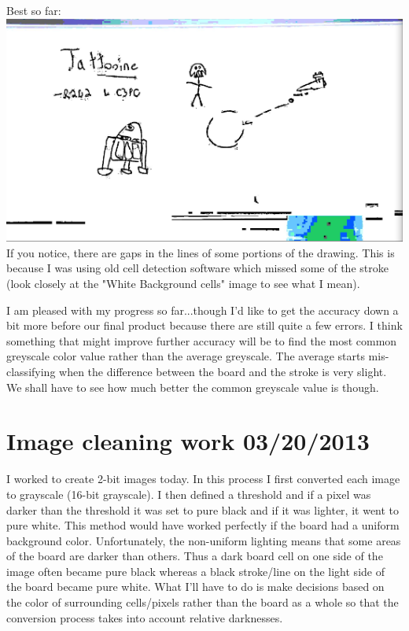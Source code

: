 \documentclass[]{article}
\begin{document}
	Best so far: \\
	\includegraphics[scale=1]{images/Best.png} \\
	
	If you notice, there are gaps in the lines of some portions of the drawing. This is because I was using old cell detection software which missed some of the stroke (look closely at the "White Background cells" image to see what I mean).
	
	I am pleased with my progress so far...though I'd like to get the accuracy down a bit more before our final product because there are still quite a few errors. I think something that might improve further accuracy will be to find the most common greyscale color value rather than the average greyscale. The average starts mis-classifying when the difference between the board and the stroke is very slight. We shall have to see how much better the common greyscale value is though.
		
	\section{Image cleaning work 03/20/2013}
	
	I worked to create 2-bit images today.
	In this process I first converted each image to grayscale (16-bit grayscale). I then defined a threshold and if a pixel was darker than the threshold it was set to pure black and if it was lighter, it went to pure white. This method would have worked perfectly if the board had a uniform background color. Unfortunately, the non-uniform lighting means that some areas of the board are darker than others. Thus a dark board cell on one side of the image often became pure black whereas a black stroke/line on the light side of the board became pure white. What I'll have to do is make decisions based on the color of surrounding cells/pixels rather than the board as a whole so that the conversion process takes into account relative darknesses.
\end{document}
